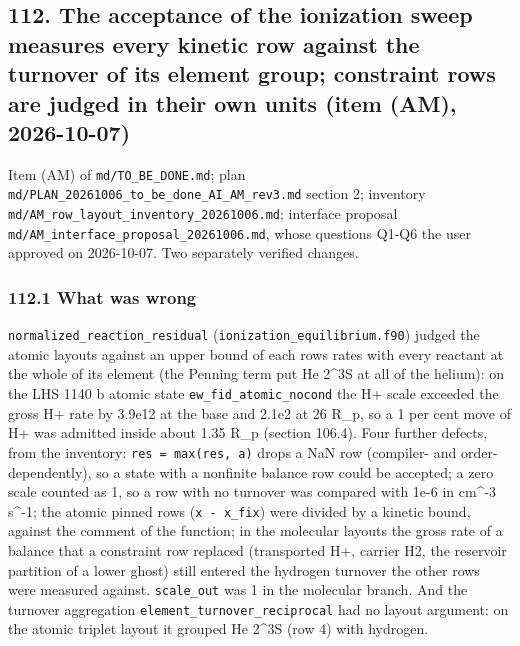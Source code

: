 \documentclass[english,a4paper]{my_memo}
\begin{document}
\subsection{112. The acceptance of the ionization sweep measures every kinetic row against the turnover of its element group; constraint rows are judged in their own units (item (AM), 2026-10-07)}\label{112-the-acceptance-of-the-ionization-sweep-measures-every-kinetic-row-against-the-turnover-of-its-element-group-constraint-rows-are-judged-in-their-own-units-item-am-2026-10-07}

Item (AM) of \texttt{md/TO\_BE\_DONE.md}; plan \texttt{md/PLAN\_20261006\_to\_be\_done\_AI\_AM\_rev3.md}
section 2; inventory \texttt{md/AM\_row\_layout\_inventory\_20261006.md}; interface
proposal \texttt{md/AM\_interface\_proposal\_20261006.md}, whose questions Q1-Q6 the
user approved on 2026-10-07. Two separately verified changes.

\subsubsection{112.1 What was wrong}\label{1121-what-was-wrong}

\texttt{normalized\_reaction\_residual} (\texttt{ionization\_equilibrium.f90}) judged the
atomic layouts against an upper bound of each row\textquotesingle s rates with every reactant
at the whole of its element (the Penning term put He 2\^{}3S at all of the
helium): on the LHS 1140 b atomic state \texttt{ew\_fid\_atomic\_nocond} the H+ scale
exceeded the gross H+ rate by 3.9e12 at the base and 2.1e2 at 26 R\_p, so a
1 per cent move of H+ was admitted inside about 1.35 R\_p (section 106.4).
Four further defects, from the inventory: \texttt{res\ =\ max(res,\ a)} drops a NaN row
(compiler- and order-dependently), so a state with a nonfinite balance row
could be accepted; a zero scale counted as 1, so a row with no turnover was
compared with 1e-6 in cm\^{}-3 s\^{}-1; the atomic pinned rows (\texttt{x\ -\ x\_fix}) were
divided by a kinetic bound, against the comment of the function; in the
molecular layouts the gross rate of a balance that a constraint row replaced
(transported H+, carrier H2, the reservoir partition of a lower ghost) still
entered the hydrogen turnover the other rows were measured against.
\texttt{scale\_out} was 1 in the molecular branch. And the turnover aggregation
\texttt{element\_turnover\_reciprocal} had no layout argument: on the atomic triplet
layout it grouped He 2\^{}3S (row 4) with hydrogen.
\end{document}
